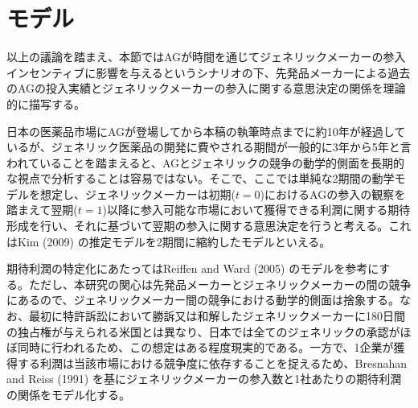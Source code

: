 \documentclass[a4j,10.5pt]{jarticle}
\begin{document}
\section{モデル}
以上の議論を踏まえ、本節ではAGが時間を通じてジェネリックメーカーの参入インセンティブに影響を与えるというシナリオの下、先発品メーカーによる過去のAGの投入実績とジェネリックメーカーの参入に関する意思決定の関係を理論的に描写する。\par
日本の医薬品市場にAGが登場してから本稿の執筆時点までに約10年が経過しているが、ジェネリック医薬品の開発に費やされる期間が一般的に3年から5年と言われていることを踏まえると、AGとジェネリックの競争の動学的側面を長期的な視点で分析することは容易ではない。そこで、ここでは単純な2期間の動学モデルを想定し、ジェネリックメーカーは初期($t = 0$)におけるAGの参入の観察を踏まえて翌期($t = 1$)以降に参入可能な市場において獲得できる利潤に関する期待形成を行い、それに基づいて翌期の参入に関する意思決定を行うと考える。これはKim (2009) の推定モデルを2期間に縮約したモデルといえる。\par
期待利潤の特定化にあたってはReiffen and Ward (2005) のモデルを参考にする。ただし、本研究の関心は先発品メーカーとジェネリックメーカーの間の競争にあるので、ジェネリックメーカー間の競争における動学的側面は捨象する。なお、最初に特許訴訟において勝訴又は和解したジェネリックメーカーに180日間の独占権が与えられる米国とは異なり、日本では全てのジェネリックの承認がほぼ同時に行われるため、この想定はある程度現実的である。一方で、1企業が獲得する利潤は当該市場における競争度に依存することを捉えるため、Bresnahan and Reiss (1991) を基にジェネリックメーカーの参入数と1社あたりの期待利潤の関係をモデル化する。
\end{document}
